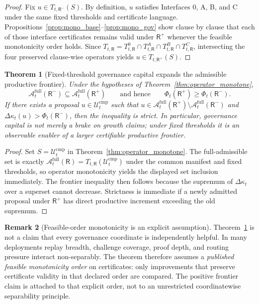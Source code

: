 \documentclass[11pt]{article}
\newtheorem{theorem}{Theorem}[section]
\theoremstyle{definition}
\newtheorem{remark}[theorem]{Remark}
\newcommand{\1}{\mathbf{1}}
\begin{document}
\begin{proof}
Fix $u\in T_{t,\mathsf R^-}(S)$. By definition, $u$ satisfies Interfaces 0, A, B, and C under the same fixed thresholds and certificate language. Propositions~\ref{prop:mono_base}--\ref{prop:mono_gov} show clause by clause that each of those interface certificates remains valid under $\mathsf R^+$ whenever the feasible monotonicity order holds. Since $T_{t,\mathsf R}=T_{t,\mathsf R}^{0}\cap T_{t,\mathsf R}^{A}\cap T_{t,\mathsf R}^{B}\cap T_{t,\mathsf R}^{C}$, intersecting the four preserved clause-wise operators yields $u\in T_{t,\mathsf R^+}(S)$.
\end{proof}

\begin{theorem}[Fixed-threshold governance capital expands the admissible productive frontier]\label{thm:frontier_monotone}
Under the hypotheses of Theorem~\ref{thm:operator_monotone},
\[
\mathcal A_t^{\mathrm{full}}(\mathsf R^-)\subseteq \mathcal A_t^{\mathrm{full}}(\mathsf R^+)
\qquad\text{and hence}\qquad
\Phi_t(\mathsf R^+)\ge \Phi_t(\mathsf R^-).
\]
If there exists a proposal $u\in\mathcal U_t^{\mathrm{cmp}}$ such that $u\in \mathcal A_t^{\mathrm{full}}(\mathsf R^+)\setminus \mathcal A_t^{\mathrm{full}}(\mathsf R^-)$ and $\Delta\kappa_t(u)>\Phi_t(\mathsf R^-)$, then the inequality is strict. In particular, governance capital is not merely a brake on growth claims; under fixed thresholds it is an observable enabler of a larger certifiable productive frontier.
\end{theorem}

\begin{proof}
Set $S=\mathcal U_t^{\mathrm{cmp}}$ in Theorem~\ref{thm:operator_monotone}. The full-admissible set is exactly $\mathcal A_t^{\mathrm{full}}(\mathsf R)=T_{t,\mathsf R}(\mathcal U_t^{\mathrm{cmp}})$ under the common manifest and fixed thresholds, so operator monotonicity yields the displayed set inclusion immediately. The frontier inequality then follows because the supremum of $\Delta\kappa_t$ over a superset cannot decrease. Strictness is immediate if a newly admitted proposal under $\mathsf R^+$ has direct productive increment exceeding the old supremum.
\end{proof}

\begin{remark}[Feasible-order monotonicity is an explicit assumption]\label{rem:frontier_order}
Theorem~\ref{thm:frontier_monotone} is not a claim that every governance coordinate is independently helpful. In many deployments replay breadth, challenge coverage, proof depth, and routing pressure interact non-separably. The theorem therefore assumes a \emph{published feasible monotonicity order} on certificates: only improvements that preserve certificate validity in that declared order are compared. The positive frontier claim is attached to that explicit order, not to an unrestricted coordinatewise separability principle.
\end{remark}
\end{document}
